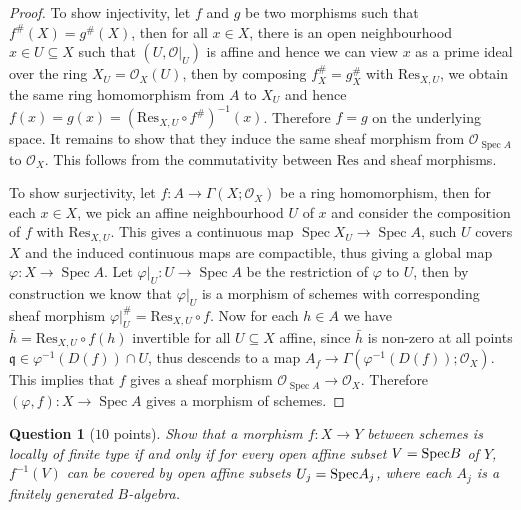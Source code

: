 \documentclass[12pt]{amsart}
\newcommand{\spec}{\operatorname{Spec}}
\newtheorem{question}{Question}
\begin{document}
\begin{proof}
	To show injectivity, let $f$ and $g$ be two morphisms such that $f^{\# } (X)=g^{\# } (X)$, then for all $x\in X$, there is an open neighbourhood $x\in U\subseteq X$ such that $(U,\mathscr{O}\vert_U )$ is affine and hence we can view $x$ as a prime ideal over the ring $X_U =\mathcal{O}_X (U)$, then by composing $f^{\# }_X =g^{\# }_X $ with $\mathrm{Res}_{X,U} $, we obtain the same ring homomorphism from $A$ to $X_U $ and hence $f(x)=g(x)=(\mathrm{Res}_{X,U}\circ f^{\# } )^{-1} (x)$. Therefore $f=g$ on the underlying space. It remains to show that they induce the same sheaf morphism from $\mathcal{O}_{\spec A} $ to $\mathcal{O}_X $. This follows from the commutativity between $\mathrm{Res} $ and sheaf morphisms.

  To show surjectivity, let $f\colon A\to\Gamma (X;\mathcal{O}_X )$ be a ring homomorphism, then for each $x\in X$, we pick an affine neighbourhood $U$ of $x$ and consider the composition of $f$ with $\mathrm{Res}_{X,U} $. This gives a continuous map $\spec X_U\to \spec A$, such $U$ covers $X$ and the induced continuous maps are compactible, thus giving a global map $\varphi\colon X\to\spec A$. Let $\varphi\vert_U\colon U\to\spec A$ be the restriction of $\varphi $ to $U$, then by construction we know that $\varphi\vert_U $ is a morphism of schemes with corresponding sheaf morphism $\varphi\vert_U^{\# } =\mathrm{Res}_{X,U}\circ f$. Now for each $h\in A$ we have $\bar{h} =\mathrm{Res}_{X,U}\circ f(h)$ invertible for all $U\subseteq X$ affine, since $\bar{h} $ is non-zero at all points $\mathfrak{q}\in\varphi^{-1} (D(f))\cap U$, thus descends to a map $A_f\to\Gamma (\varphi^{-1} (D(f));\mathcal{O}_X )$. This implies that $f$ gives a sheaf morphism $\mathcal{O}_{\spec A}\to\mathcal{O}_X $. Therefore $(\varphi ,f)\colon X\to\spec A$ gives a morphism of schemes.
\end{proof}

\begin{question}[$10$ points]
Show that a morphism $f: X \to Y$ between schemes is locally of finite type if and only if for every open affine subset $V = {\rm Spec} B$ of $Y$, $f^{-1}(V)$ can be covered by open affine subsets $U_j = {\rm Spec} A_j$, where each $A_j$ is a finitely generated $B$-algebra.

\end{question}
\end{document}
